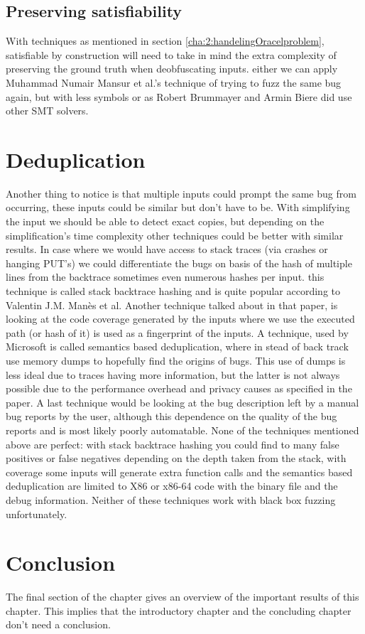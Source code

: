 \subsection{Preserving satisfiability}
With techniques as mentioned in section \ref{cha:2:handelingOracelproblem}, satisfiable by construction will need to take in mind the extra complexity of preserving the ground truth when deobfuscating inputs. either we can apply Muhammad Numair Mansur et al.'s\cite{1mansur2020detecting} technique of trying to fuzz the same bug again, but with less symbols or as Robert Brummayer and Armin Biere\cite{2FuzzingAndDeltaDebuggingSMTSolvers} did use other SMT solvers.

\section{Deduplication}
\label{cha:3:Deduplication}
Another thing to notice is that multiple inputs could prompt the same bug from occurring, these inputs could be similar but don't have to be. With simplifying the input we should be able to detect exact copies, but depending on the simplification's time complexity other techniques could be better with similar results. In case where we would have access to stack traces (via crashes or hanging PUT's) we could differentiate the bugs on basis of the hash of multiple lines from the backtrace sometimes even numerous hashes per input. this technique is called stack backtrace hashing and is quite popular according to Valentin J.M. Man\`es et al\cite{13manes2019survey}. Another technique talked about in that paper, is looking at the code coverage generated by the inputs where we use the executed path (or hash of it) is used as a fingerprint of the inputs. A technique, used by Microsoft\cite{36semanticsAwareDeduplicationRETracer} is called semantics based deduplication, where in stead of back track use memory dumps to hopefully find the origins of bugs. This use of dumps is less ideal due to traces having more information, but the latter is not always possible due to the performance overhead and privacy causes as specified in the paper. A last technique would be looking at the bug description left by a manual bug reports by the user, although this dependence on the quality of the bug reports and is most likely poorly automatable. None of the techniques mentioned above are perfect: with stack backtrace hashing you could find to many false positives or false negatives depending on the depth taken from the stack, with coverage some inputs will generate extra function calls and the semantics based deduplication are limited to X86 or x86-64 code with the binary file and the debug information. Neither of these techniques work with black box fuzzing unfortunately.

\section{Conclusion}
\label{cha:3:Conclusion}
The final section of the chapter gives an overview of the important results
of this chapter. This implies that the introductory chapter and the
concluding chapter don't need a conclusion.


